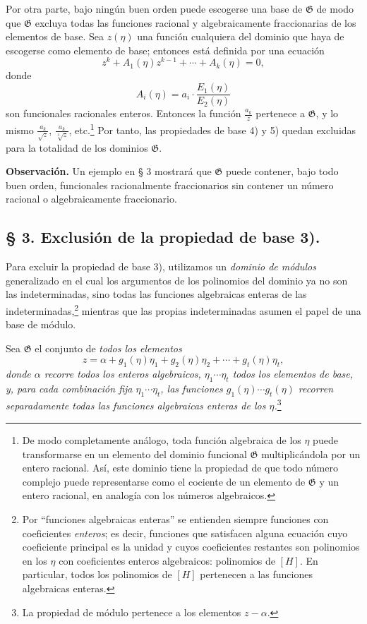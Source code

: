 Por otra parte, bajo ningún buen orden puede escogerse una base de $\mathfrak G$ de modo que $\mathfrak G$ excluya todas las funciones racional y algebraicamente fraccionarias de los elementos de base. Sea $z(\eta)$ una función cualquiera del dominio que haya de escogerse como elemento de base; entonces está definida por una ecuación
\[
 z^k+A_1(\eta)z^{k-1}+\cdots+A_k(\eta)=0,
\]
donde
\[
 A_i(\eta)=a_i\cdot\frac{E_1(\eta)}{E_2(\eta)}
\]
son funcionales racionales enteros. Entonces la función $\frac{a_k}{z}$ pertenece a $\mathfrak G$, y lo mismo $\frac{a_k}{\sqrt z}$, $\frac{a_k}{\sqrt[3]z}$, etc.\footnote{De modo completamente análogo, toda función algebraica de los $\eta$ puede transformarse en un elemento del dominio funcional $\mathfrak G$ multiplicándola por un entero racional. Así, este dominio tiene la propiedad de que todo número complejo puede representarse como el cociente de un elemento de $\mathfrak G$ y un entero racional, en analogía con los números algebraicos.} Por tanto, las propiedades de base 4) y 5) quedan excluidas para la totalidad de los dominios $\mathfrak G$.

\textbf{Observación.} Un ejemplo en § 3 mostrará que $\mathfrak G$ puede contener, bajo todo buen orden, funcionales racionalmente fraccionarios sin contener un número racional o algebraicamente fraccionario.

\subsection*{§ 3. Exclusión de la propiedad de base 3).}

Para excluir la propiedad de base 3), utilizamos un \emph{dominio de módulos} generalizado en el cual los argumentos de los polinomios del dominio ya no son las indeterminadas, sino todas las funciones algebraicas enteras de las indeterminadas,\footnote{Por ``funciones algebraicas enteras'' se entienden siempre funciones con coeficientes \emph{enteros}; es decir, funciones que satisfacen alguna ecuación cuyo coeficiente principal es la unidad y cuyos coeficientes restantes son polinomios en los $\eta$ con coeficientes enteros algebraicos: polinomios de $[H]$. En particular, todos los polinomios de $[H]$ pertenecen a las funciones algebraicas enteras.} mientras que las propias indeterminadas asumen el papel de una base de módulo.

Sea $\mathfrak G$ el conjunto de \emph{todos los elementos}
\begin{equation}
 z=\alpha+g_1(\eta)\eta_1+g_2(\eta)\eta_2+\cdots+g_t(\eta)\eta_t,
\tag{1}
\end{equation}
\emph{donde $\alpha$ recorre todos los enteros algebraicos, $\eta_1\cdots\eta_t$ todos los elementos de base, y, para cada combinación fija $\eta_1\cdots\eta_t$, las funciones $g_1(\eta)\cdots g_t(\eta)$ recorren separadamente todas las funciones algebraicas enteras de los $\eta$.}\footnote{La propiedad de módulo pertenece a los elementos $z-\alpha$.}


